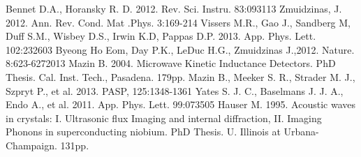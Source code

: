 











 

\begin{thebibliography}{8}
\singlespacing
\footnotesize
\setlength{\itemsep}{0pt}
    Bennet D.A., Horansky R. D. 2012. Rev. Sci. Instru. 83:093113   
    Zmuidzinas, J. 2012. Ann. Rev. Cond. Mat .Phys. 3:169-214
    Vissers M.R., Gao J., Sandberg M, Duff S.M., Wisbey D.S., Irwin K.D, Pappas D.P. 2013. App. Phys. Lett. 102:232603
    Byeong Ho Eom, Day P.K., LeDuc H.G., Zmuidzinas J.,2012. Nature. 8:623-6272013
    Mazin  B. 2004. Microwave Kinetic Inductance Detectors. PhD Thesis. Cal. Inst. Tech., Pasadena. 179pp.
    Mazin B., Meeker S. R., Strader M. J., Szpryt P., et al. 2013. PASP, 125:1348-1361 
	Yates S. J. C., Baselmans J. J. A., Endo A., et al. 2011. App. Phys. Lett. 99:073505
    Hauser M. 1995. Acoustic waves in crystals: I. Ultrasonic flux Imaging and internal diffraction, II. Imaging Phonons in superconducting niobium. PhD Thesis. U. Illinois at Urbana-Champaign. 131pp.	
\end{thebibliography}



